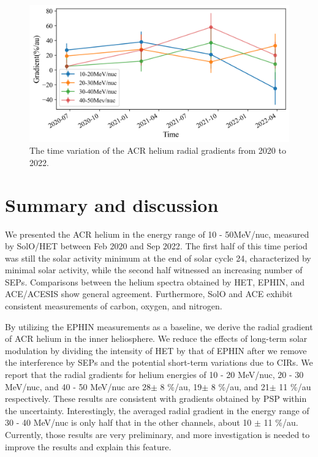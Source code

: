 \begin{figure}[!htb]
    \centering
    \includegraphics[width = \textwidth, height = 0.3\textheight]{images/ACR/timevariation_normalmask_gradient.png}
    \caption[The time variation of the \ac{ACR} helium radial gradients]{The time variation of the \ac{ACR} helium radial gradients from 2020 to 2022. }
    \label{fig:radialgradient_time_variation}
\end{figure}



\section{ Summary and discussion}

We presented the \ac{ACR} helium in the energy range of 10 - 50MeV/nuc, measured by \ac{SolO}/\ac{HET} between Feb 2020 and Sep 2022. The first half of this time period was still the solar activity minimum at the end of solar cycle 24, characterized by minimal solar activity, while the second half witnessed an increasing number of \acp{SEP}.
Comparisons between the helium spectra obtained by \ac{HET}, \ac{EPHIN}, and \ac{ACE}/\ac{ACESIS} show general agreement. Furthermore, \ac{SolO} and \ac{ACE} exhibit consistent measurements of carbon, oxygen, and nitrogen.

By utilizing the \ac{EPHIN} measurements as a baseline, we derive the radial gradient of \ac{ACR} helium in the inner heliosphere. We reduce the effects of long-term solar modulation by dividing the intensity of  \ac{HET} by that of \ac{EPHIN} 
after we remove the interference by \acp{SEP} and the potential short-term variations due to \acp{CIR}.
We report that the radial gradients for helium energies of 10 - 20 MeV/nuc, 20 - 30 MeV/nuc, and 40 - 50 MeV/nuc are 28$\pm$ 8 \%/au, 19$\pm$ 8 \%/au, and 21$\pm$ 11 \%/au respectively. 
These results are consistent with gradients obtained by \ac{PSP} within the uncertainty. Interestingly, the averaged radial gradient in the energy range of 30 - 40 MeV/nuc is only half that in the other channels, about 10 $\pm$ 11 \%/au. Currently, those results are very preliminary, and more investigation is needed to improve the results and explain this feature.

